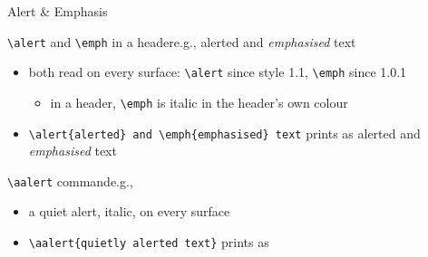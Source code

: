 \begin{frame}[c,fragile]{Alert \& Emphasis}
%
\begin{block}{\texttt{\textbackslash{}alert} and \texttt{\textbackslash{}emph} in a header\textemdash{}e.g., \alert{alerted} and \emph{emphasised} text}
\begin{itemize}
	\item both read on every surface: \texttt{\textbackslash{}alert} since style 1.1, \texttt{\textbackslash{}emph} since 1.0.1
	\begin{itemize}
		\item in a header, \texttt{\textbackslash{}emph} is italic in the header's own colour
	\end{itemize}
	\item[e.g.] \verb|\alert{alerted} and \emph{emphasised} text| prints as \alert{alerted} and \emph{emphasised} text
\end{itemize}
\end{block}
%
\begin{block}{\texttt{\textbackslash{}aalert} command\textemdash{}e.g., }
\begin{itemize}
	\item a quiet alert, italic, on every surface
	\item[e.g.] \verb|| prints as \aalert{quietly alerted text}
\end{itemize}
\end{block}
%
\end{frame}
